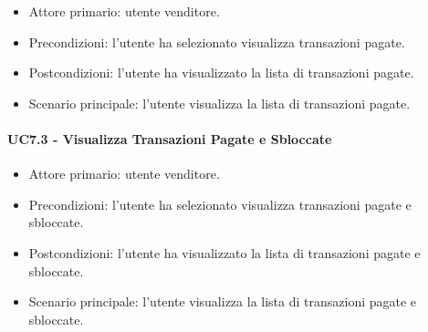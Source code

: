 \begin{itemize}
    \item Attore primario: utente venditore.
    \item Precondizioni: l'utente ha selezionato visualizza transazioni pagate.
    \item Postcondizioni: l'utente ha visualizzato la lista di transazioni pagate.
    \item Scenario principale: l'utente visualizza la lista di transazioni pagate.
\end{itemize}

\paragraph{UC7.3 - Visualizza Transazioni Pagate e Sbloccate}

\begin{itemize}
    \item Attore primario: utente venditore.
    \item Precondizioni: l'utente ha selezionato visualizza transazioni pagate e sbloccate.
    \item Postcondizioni: l'utente ha visualizzato la lista di transazioni pagate e sbloccate.
    \item Scenario principale: l'utente visualizza la lista di transazioni pagate e sbloccate.
\end{itemize}